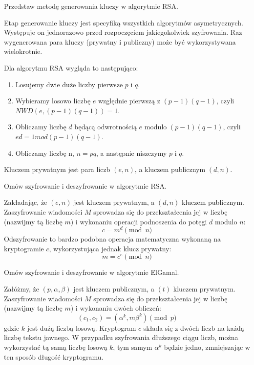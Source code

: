 \documentclass[answers,11pt]{exam}
\begin{document}
\begin{questions}
\question Przedstaw metodę generowania kluczy w algorytmie RSA.
\begin{solution}
Etap generowanie kluczy jest specyfiką wszystkich algorytmów asymetrycznych. Występuje on jednorazowo przed rozpoczęciem jakiegokolwiek szyfrowania. Raz wygenerowana para kluczy (prywatny i publiczny) może być wykorzystywana wielokrotnie. 

Dla algorytmu RSA wygląda to następująco:
\begin{enumerate}
\item Losujemy dwie duże liczby pierwsze $p$ i $q$.
\item Wybieramy losowo liczbę $e$ względnie pierwszą z $(p-1)(q-1)$, czyli $NWD(e, (p-1)(q-1)) = 1$.
\item Obliczamy liczbę $d$ będącą odwrotnością $e$ modulo $(p-1)(q-1)$, czyli $ ed = 1 mod (p-1)(q-1)$.
\item Obliczamy liczbę n, $n = pq$, a następnie niszczymy $p$ i $q$. 
\end{enumerate}
Kluczem prywatnym jest para liczb $(e,n)$, a kluczem publicznym $(d,n)$.
\end{solution}

\question Omów szyfrowanie i deszyfrowanie w algorytmie RSA.
\begin{solution}
Zakładając, że $(e,n)$ jest kluczem prywatnym, a $(d,n)$ kluczem publicznym. Zaszyfrowanie wiadomości $M$ sprowadza się do przekształcenia jej w liczbę (nazwijmy tą liczbę $m$) i wykonaniu operacji podnoszenia do potęgi $d$ modulo $n$:
\begin{equation}
 c = m^d \pmod{n}
\end{equation}
Odszyfrowanie to bardzo podobna operacja matematyczna wykonaną na kryptogramie $c$, wykorzystująca jednak klucz prywatny:
\begin{equation}
 m = c^e \pmod{n}
\end{equation}
\end{solution}

\question Omów szyfrowanie i deszyfrowanie w algorytmie ElGamal.
\begin{solution}
Załóżmy, że $(p,\alpha,\beta)$ jest kluczem publicznym, a $(t)$ kluczem prywatnym. Zaszyfrowanie wiadomości $M$ sprowadza się do przekształcenia jej w liczbę (nazwijmy tą liczbę $m$) i wykonaniu dwóch obliczeń:
\begin{equation}
 (c_1, c_2) = (\alpha^k, m\beta^k) \pmod{p}
\end{equation}
gdzie $k$ jest dużą liczbą losową. Kryptogram $c$ składa się z dwóch liczb na każdą liczbę tekstu jawnego. W przypadku szyfrowania dłuższego ciągu liczb, można wykorzystać tą samą liczbę losową $k$, tym samym $\alpha^k$ będzie jedno, zmniejszając w ten sposób długość kryptogramu.
  

\end{solution}
\end{questions}
\end{document}
